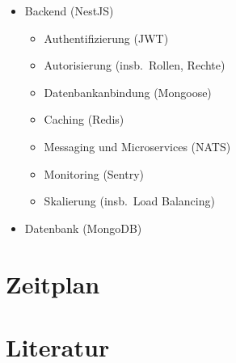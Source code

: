 \begin{itemize}
\begin{itemize}
    \end{itemize}
    \item Backend (NestJS)
    \begin{itemize}
        \item Authentifizierung (JWT)
        \item Autorisierung (insb.\ Rollen, Rechte)
        \item Datenbankanbindung (Mongoose)
        \item Caching (Redis)
        \item Messaging und Microservices (NATS)
        \item Monitoring (Sentry)
        \item Skalierung (insb.\ Load Balancing)
    \end{itemize}
    \item Datenbank (MongoDB)
\end{itemize}

\section{Zeitplan}\label{sec:zeitplan}

\section{Literatur}\label{sec:literatur}

\cite{dragon-book}
